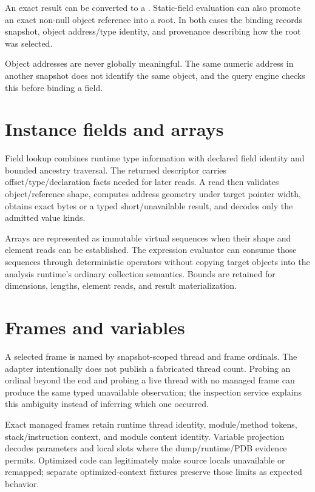 \documentclass[11pt,oneside,openany]{book}
\newcommand{\typeName}[1]{\texttt{\detokenize{#1}}}
\begin{document}
An exact result can be converted to a \typeName{DumpObjectBinding}. Static-field evaluation can also promote an exact non-null object reference into a root. In both cases the binding records snapshot, object address/type identity, and provenance describing how the root was selected.

Object addresses are never globally meaningful. The same numeric address in another snapshot does not identify the same object, and the query engine checks this before binding a field.

\section{Instance fields and arrays}

Field lookup combines runtime type information with declared field identity and bounded ancestry traversal. The returned descriptor carries offset/type/declaration facts needed for later reads. A read then validates object/reference shape, computes address geometry under target pointer width, obtains exact bytes or a typed short/unavailable result, and decodes only the admitted value kinds.

Arrays are represented as immutable virtual sequences when their shape and element reads can be established. The expression evaluator can consume those sequences through deterministic operators without copying target objects into the analysis runtime's ordinary collection semantics. Bounds are retained for dimensions, lengths, element reads, and result materialization.

\section{Frames and variables}

A selected frame is named by snapshot-scoped thread and frame ordinals. The adapter intentionally does not publish a fabricated thread count. Probing an ordinal beyond the end and probing a live thread with no managed frame can produce the same typed unavailable observation; the inspection service explains this ambiguity instead of inferring which one occurred.

Exact managed frames retain runtime thread identity, module/method tokens, stack/instruction context, and module content identity. Variable projection decodes parameters and local slots where the dump/runtime/PDB evidence permits. Optimized code can legitimately make source locals unavailable or remapped; separate optimized-context fixtures preserve those limits as expected behavior.
\end{document}
